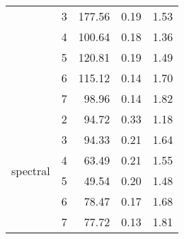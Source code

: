 \begin{tabular}{llrrr}
                                 & 3          & 177.56            & 0.19                      & 1.53              \\
                                 & 4          & 100.64            & 0.18                      & 1.36              \\
                                 & 5          & 120.81            & 0.19                      & 1.49              \\
                                 & 6          & 115.12            & 0.14                      & 1.70              \\
                                 & 7          & 98.96             & 0.14                      & 1.82              \\
\midrule
\multirow[c]{6}{*}{spectral}     & 2          & 94.72             & 0.33                      & 1.18              \\
                                 & 3          & 94.33             & 0.21                      & 1.64              \\
                                 & 4          & 63.49             & 0.21                      & 1.55              \\
                                 & 5          & 49.54             & 0.20                      & 1.48              \\
                                 & 6          & 78.47             & 0.17                      & 1.68              \\
                                 & 7          & 77.72             & 0.13                      & 1.81              \\
\bottomrule
\end{tabular}
